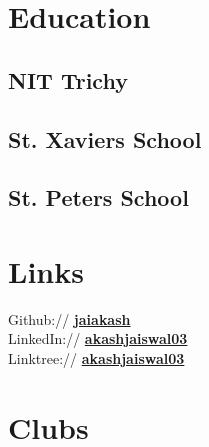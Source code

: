 \documentclass[]{deedy-resume-openfont}
\begin{document}
    
%
%


\begin{minipage}[t]{0.33\textwidth} 


\section{Education}

\subsection{NIT Trichy}
\sectionsep

\subsection{St. Xavier\textquotesingle{}s School}
\sectionsep

\subsection{St. Peter\textquotesingle{}s School}
\sectionsep


\section{Links} 
Github:// \href{https://github.com/jaiakash}{\bf jaiakash} \\
LinkedIn://  \href{https://www.linkedin.com/in/akashjaiswal03}{\bf akashjaiswal03} \\
Linktree://  \href{https://linktr.ee/akashjaiswal03}{\bf akashjaiswal03} \\

%
%
\section{Clubs}

\end{minipage}
\end{document}
